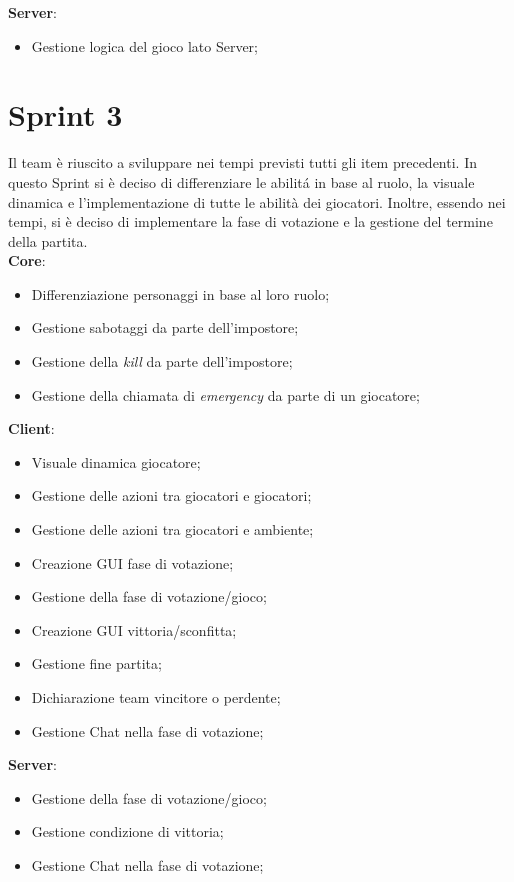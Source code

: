 \textbf{Server}:
\begin{itemize}
    \item Gestione logica del gioco lato Server;
\end{itemize}

\section{Sprint 3}
Il team \`e riuscito a sviluppare nei tempi previsti tutti gli item precedenti.
In questo Sprint si \`e deciso di differenziare le abilit\'a in base al ruolo, la visuale dinamica e l'implementazione di tutte le abilit\`a dei giocatori.
Inoltre, essendo nei tempi, si \`e deciso di implementare la fase di votazione e la gestione del termine della partita.\\

\textbf{Core}:
\begin{itemize}
    \item Differenziazione personaggi in base al loro ruolo;
    \item Gestione sabotaggi da parte dell'impostore;
    \item Gestione della \textit{kill} da parte dell'impostore;
    \item Gestione della chiamata di \textit{emergency} da parte di un giocatore;
\end{itemize}

\textbf{Client}:
\begin{itemize}
    \item Visuale dinamica giocatore;
    \item Gestione delle azioni tra giocatori e giocatori;
    \item Gestione delle azioni tra giocatori e ambiente;
    \item Creazione GUI fase di votazione;
    \item Gestione della fase di votazione/gioco;
    \item Creazione GUI vittoria/sconfitta;
    \item Gestione fine partita;
    \item Dichiarazione team vincitore o perdente;
    \item Gestione Chat nella fase di votazione;
\end{itemize}

\textbf{Server}:
\begin{itemize}
    \item Gestione della fase di votazione/gioco;
    \item Gestione condizione di vittoria;
    \item Gestione Chat nella fase di votazione;
\end{itemize}


